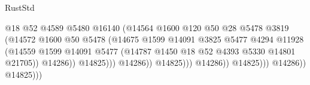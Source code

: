 \begin{lexlean}{RustStd}
\begin{coremodule}
                                                    @18
                                                    @52
                                                    @4589
                                                    @5480
                                                    @16140
                                                    (@14564
                                                      @1600
                                                      @120
                                                      @50
                                                      @28
                                                      @5478
                                                      @3819
                                                      (@14572
                                                        @1600
                                                        @50
                                                        @5478
                                                        (@14675
                                                          @1599
                                                          @14091
                                                          @3825
                                                          @5477
                                                          @4294
                                                          @11928
                                                          (@14559
                                                            @1599
                                                            @14091
                                                            @5477
                                                            (@14787
                                                              @1450
                                                              @18
                                                              @52
                                                              @4393
                                                              @5330
                                                              @14801
                                                              @21705))
                                                          @14286))
                                                      @14825)))
                                                @14286))
                                            @14825)))
                                      @14286))
                                  @14825)))
                            @14286))
                        @14825)))

\end{coremodule}
\end{lexlean}
